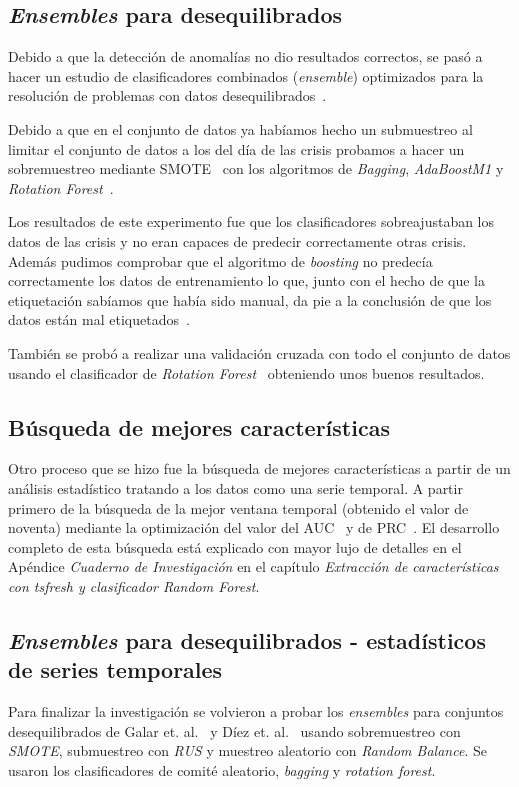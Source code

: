 \subsection{\textit{Ensembles} para desequilibrados}
Debido a que la detección de anomalías no dio resultados correctos, se pasó a hacer un estudio de clasificadores combinados (\textit{ensemble}) optimizados para la resolución de problemas con datos desequilibrados~\cite{diez2015diversity,galar2012review}.

Debido a que en el conjunto de datos ya habíamos hecho un submuestreo al limitar el conjunto de datos a los del día de las crisis probamos a hacer un sobremuestreo mediante SMOTE~\cite{galar2012review} con los algoritmos de \textit{Bagging}, \textit{AdaBoostM1} y \textit{Rotation Forest}~\cite{rodriguez2006rotation}.

Los resultados de este experimento fue que los clasificadores sobreajustaban los datos de las crisis y no eran capaces de predecir correctamente otras crisis. Además pudimos comprobar que el algoritmo de \textit{boosting} no predecía correctamente los datos de entrenamiento lo que, junto con el hecho de que la etiquetación sabíamos que había sido manual, da pie a la conclusión de que los datos están mal etiquetados~\cite{ubu:mineria3}.

También se probó a realizar una validación cruzada con todo el conjunto de datos usando el clasificador de \textit{Rotation Forest}~\cite{rodriguez2006rotation} obteniendo unos buenos resultados.

\subsection{Búsqueda de mejores características}
Otro proceso que se hizo fue la búsqueda de mejores características a partir de un análisis estadístico tratando a los datos como una serie temporal. A partir primero de la búsqueda de la mejor ventana temporal (obtenido el valor de noventa) mediante la optimización del valor del AUC~\cite{galar2012review} y de PRC~\cite{Davis2006RPR}. El desarrollo completo de esta búsqueda está explicado con mayor lujo de detalles en el Apéndice \textit{Cuaderno de Investigación} en el capítulo \textit{Extracción de características con tsfresh y clasificador Random Forest}.

\subsection{\textit{Ensembles} para desequilibrados - estadísticos de series temporales}
Para finalizar la investigación se volvieron a probar los \textit{ensembles} para conjuntos desequilibrados de Galar et. al.~\cite{galar2012review} y Díez et. al.~\cite{diez2015random, diez2015diversity} usando sobremuestreo con \textit{SMOTE}, submuestreo con \textit{RUS} y muestreo aleatorio con \textit{Random Balance}. Se usaron los clasificadores de comité aleatorio, \textit{bagging} y \textit{rotation forest}.

